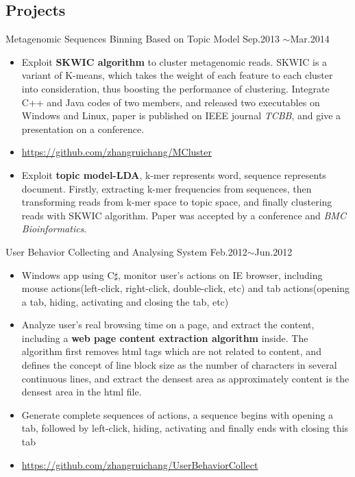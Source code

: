 \documentclass[margin]{res}
\begin{document}
\begin{resume}
\section{Projects}
Metagenomic Sequences Binning Based on Topic Model \hfill Sep.2013 $\sim$Mar.2014
\begin{spacing}{0.02}
\end{spacing}
\begin{itemize}
\item Exploit \textbf{SKWIC algorithm} to cluster metagenomic reads. SKWIC is a variant of K-means, which takes the weight of each feature to each cluster into consideration, thus boosting the performance of clustering. Integrate C++ and Java codes of two members, and released two executables on Windows and Linux, paper is published on IEEE journal \emph{TCBB}, and give a presentation on a conference.
\item \url{https://github.com/zhangruichang/MCluster}
\item Exploit \textbf{topic model-LDA}, k-mer represents word, sequence represents document. Firstly, extracting k-mer frequencies from sequences, then transforming reads from k-mer space to topic space, and finally clustering reads with SKWIC algorithm. Paper was accepted by a conference and \emph{BMC Bioinformatics}.
\end{itemize}
User Behavior Collecting and Analysing System \hfill Feb.2012$\sim$Jun.2012
\begin{spacing}{0.1}
\end{spacing}
\begin{itemize}
\item Windows app using C$\sharp$, monitor user's actions on IE browser, including mouse actions(left-click, right-click, double-click, etc) and tab actions(opening a tab, hiding, activating and closing the tab, etc)
\item Analyze user's real browsing time on a page, and extract the content, including a \textbf{web page content extraction algorithm} inside. The algorithm first removes html tags which are not related to content, and defines the concept of line block size as the number of characters in several continuous lines, and extract the densest area as approximately content is the densest area in the html file.
\item Generate complete sequences of actions, a sequence begins with opening a tab, followed by left-click, hiding, activating and finally ends with closing this tab
\item \url{https://github.com/zhangruichang/UserBehaviorCollect}
\end{itemize}

\end{resume}
\end{document}
